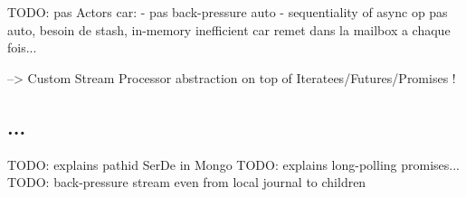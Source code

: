 TODO: pas Actors car:
- pas back-pressure auto
- sequentiality of async op pas auto, besoin de stash, in-memory inefficient car remet dans la mailbox a chaque fois...

--> Custom Stream Processor abstraction on top of Iteratees/Futures/Promises !

\subsection{...}

TODO: explains pathid SerDe in Mongo
TODO: explains long-polling promises...
TODO: back-pressure stream even from local journal to children


